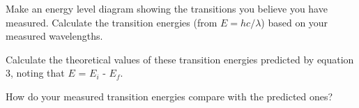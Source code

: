 \pagebreak

Make an energy level diagram showing the transitions you believe you have 
measured. Calculate the transition energies (from $E=hc/\lambda$) based on your
 measured wavelengths.
\vspace{3.0in}

Calculate the theoretical values of these transition energies predicted by 
equation 3, noting that $E$ = $E_i$ - $E_f$.
\vspace{3.0in} 

How do your measured transition energies compare with the predicted ones?

